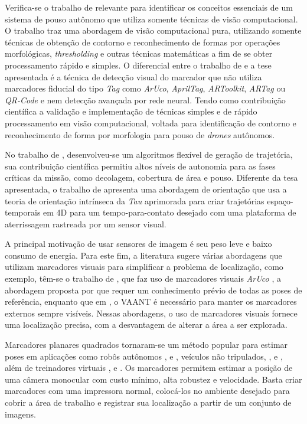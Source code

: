     Verifica-se o trabalho de \citet{Vidal2016} relevante para identificar os conceitos essenciais de um sistema de pouso autônomo que utiliza somente técnicas de visão computacional. O trabalho traz uma abordagem de visão computacional pura, utilizando somente técnicas de obtenção de contorno e reconhecimento de formas por operações morfológicas, \textit{thresholding} e outras técnicas matemáticas a fim de se obter processamento rápido e simples. O diferencial entre o trabalho de \citet{Vidal2016} e a tese apresentada é a técnica de detecção visual do marcador que não utiliza marcadores fiducial do tipo \textit{Tag} como \textit{ArUco}, \textit{AprilTag}, \textit{ARToolkit}, \textit{ARTag} ou \textit{QR-Code} e nem detecção avançada por rede neural. Tendo como contribuição científica a validação e implementação de técnicas simples e de rápido processamento em visão computacional, voltada para identificação de contorno e reconhecimento de forma por morfologia para pouso de \textit{drones} autônomos.
    
    No trabalho de \citet{Vetrella2017}, desenvolveu-se um algoritmos flexível de geração de trajetória, sua contribuição científica permitiu altos níveis de autonomia para as fases críticas da missão, como decolagem, cobertura de área e pouso. Diferente da tesa apresentada, o trabalho de \citet{Vetrella2017} apresenta uma abordagem de orientação que usa a teoria de orientação intrínseca da \textit{Tau} aprimorada para criar trajetórias espaço-temporais em 4D para um tempo-para-contato desejado com uma plataforma de aterrissagem rastreada por um sensor visual.
    
    A principal motivação de usar sensores de imagem é seu peso leve e baixo consumo de energia. Para este fim, a literatura sugere várias abordagens que utilizam marcadores visuais para simplificar a problema de localização, como exemplo, têm-se o trabalho de \citet{Pestana2016}, que faz uso de marcadores visuais \textit{ArUco} \citet{Salinas2013}, a abordagem proposta por \citet{Jayatilleke2013} que requer um conhecimento prévio de todas as poses de referência, enquanto que em \citet{Faigl2013}, o VAANT é necessário para manter os marcadores externos sempre visíveis. Nessas abordagens, o uso de marcadores visuais fornece uma localização precisa, com a desvantagem de alterar a área a ser explorada.
    
    Marcadores planares quadrados tornaram-se um método popular para estimar poses em aplicações como robôs autônomos \citet{Robert2009}, \citet{Pichler2017} e \citet{Valencia2005}, veículos não tripulados, \citet{Broggi2000}, \citet{Patterson2014} e \citet{Gonzalez2017}, além de treinadores virtuais \citet{Pflugi2017}, \citet{Chen2016} e \citet{Khattak2014}. Os marcadores permitem estimar a posição de uma câmera monocular com custo mínimo, alta robustez e velocidade. Basta criar marcadores com uma impressora normal, colocá-los no ambiente desejado para cobrir a área de trabalho e registrar sua localização a partir de um conjunto de imagens.
    
